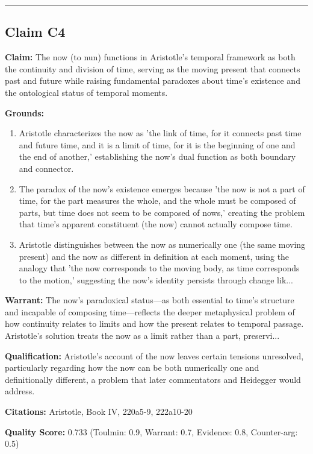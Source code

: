 \documentclass[12pt,a4paper]{article}
\begin{document}
\medskip\hrule\medskip

\subsection*{Claim C4}

\textbf{Claim:} The now (to nun) functions in Aristotle's temporal framework as both the continuity and division of time, serving as the moving present that connects past and future while raising fundamental paradoxes about time's existence and the ontological status of temporal moments.

\textbf{Grounds:}
\begin{enumerate}[nosep]
\item Aristotle characterizes the now as 'the link of time, for it connects past time and future time, and it is a limit of time, for it is the beginning of one and the end of another,' establishing the now's dual function as both boundary and connector.
\item The paradox of the now's existence emerges because 'the now is not a part of time, for the part measures the whole, and the whole must be composed of parts, but time does not seem to be composed of nows,' creating the problem that time's apparent constituent (the now) cannot actually compose time.
\item Aristotle distinguishes between the now as numerically one (the same moving present) and the now as different in definition at each moment, using the analogy that 'the now corresponds to the moving body, as time corresponds to the motion,' suggesting the now's identity persists through change lik...
\end{enumerate}

\textbf{Warrant:} The now's paradoxical status—as both essential to time's structure and incapable of composing time—reflects the deeper metaphysical problem of how continuity relates to limits and how the present relates to temporal passage. Aristotle's solution treats the now as a limit rather than a part, preservi...

\textbf{Qualification:} Aristotle's account of the now leaves certain tensions unresolved, particularly regarding how the now can be both numerically one and definitionally different, a problem that later commentators and Heidegger would address.

\textbf{Citations:} Aristotle, Book IV, 220a5-9, 222a10-20

\textbf{Quality Score:} 0.733 (Toulmin: 0.9, Warrant: 0.7, Evidence: 0.8, Counter-arg: 0.5)
\end{document}
